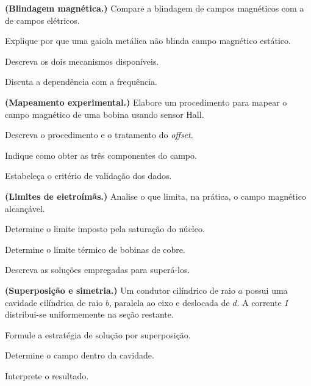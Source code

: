 \begin{questao}[4]{}

\textbf{(Blindagem magnética.)} Compare a blindagem de campos magnéticos com a
de campos elétricos.
\begin{itensq}
\item Explique por que uma gaiola metálica não blinda campo magnético estático.
\item Descreva os dois mecanismos disponíveis.
\item Discuta a dependência com a frequência.
\end{itensq}


\end{questao}
\begin{questao}[4]{}

\textbf{(Mapeamento experimental.)} Elabore um procedimento para mapear o campo
magnético de uma bobina usando sensor Hall.
\begin{itensq}
\item Descreva o procedimento e o tratamento do \emph{offset}.
\item Indique como obter as três componentes do campo.
\item Estabeleça o critério de validação dos dados.
\end{itensq}


\end{questao}
\begin{questao}[4]{}

\textbf{(Limites de eletroímãs.)} Analise o que limita, na prática, o campo
magnético alcançável.
\begin{itensq}
\item Determine o limite imposto pela saturação do núcleo.
\item Determine o limite térmico de bobinas de cobre.
\item Descreva as soluções empregadas para superá-los.
\end{itensq}


\end{questao}
\begin{questao}[4]{}

\textbf{(Superposição e simetria.)} Um condutor cilíndrico de raio $a$ possui
uma cavidade cilíndrica de raio $b$, paralela ao eixo e deslocada de $d$.
A corrente $I$ distribui-se uniformemente na seção restante.
\begin{itensq}
\item Formule a estratégia de solução por superposição.
\item Determine o campo dentro da cavidade.
\item Interprete o resultado.
\end{itensq}


\end{questao}

